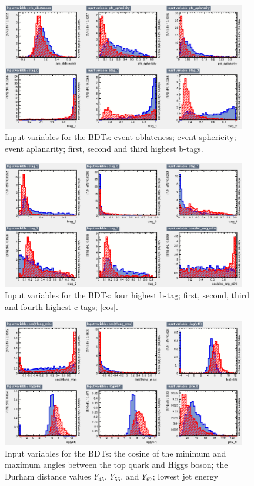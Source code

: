 \begin{figure}[p]
	\centering
	\includegraphics[width=0.95\textwidth]{../Pictures/Analysis/BDTs/variables_id_c2.eps}
	\caption{Input variables for the BDTs: event oblateness; event sphericity; event aplanarity; first, second and third highest b-tags.}
	\label{figure:analysis/results/tmva-inputs-2}
\end{figure}

\begin{figure}[p]
	\centering
	\includegraphics[width=0.95\textwidth]{../Pictures/Analysis/BDTs/variables_id_c3.eps}
	\caption{Input variables for the BDTs: four highest b-tag; first, second, third and fourth highest c-tags; [cos].}
	\label{figure:analysis/results/tmva-inputs-3}
\end{figure}

\begin{figure}[p]
	\centering
	\includegraphics[width=0.95\textwidth]{../Pictures/Analysis/BDTs/variables_id_c4.eps}
	\caption{Input variables for the BDTs: the cosine of the minimum and maximum angles between the top quark and Higgs boson; the Durham distance values $Y_{45}$, $Y_{56}$, and $Y_{67}$; lowest jet energy}
	\label{figure:analysis/results/tmva-inputs-4}
\end{figure}

